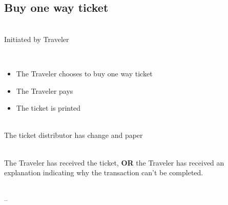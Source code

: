 \subsection{Buy one way ticket}


 \\
Initiated by Traveler
\\

 \\
\begin{itemize}

\item The Traveler chooses to buy one way ticket
\item The Traveler pays
\item The ticket is printed

\end{itemize}

 \\
The ticket distributor has change and paper
\\

 \\
The Traveler has received the ticket, \textbf{OR} the Traveler has received an explanation indicating why the transaction can't be completed.
\\

 \\
--
\\
